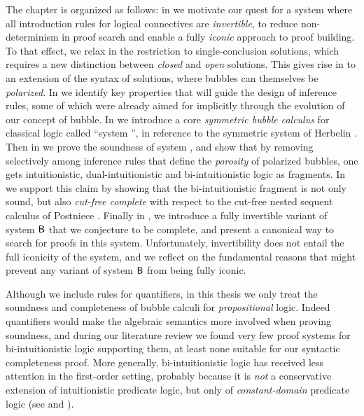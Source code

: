 The chapter is organized as follows: in  we motivate our
quest for a system where all introduction rules for logical connectives are
\emph{invertible}, to reduce non-determinism in proof search and enable a fully
\emph{iconic} approach to proof building. To that effect, we relax in
 the restriction to single-conclusion solutions, which
requires a new distinction between \emph{closed} and \emph{open} solutions. This
gives rise in  to an extension of the syntax of solutions, where
bubbles can themselves be \emph{polarized}. In  we identify
key properties that will guide the design of inference rules, some of which were
already aimed for implicitly through the evolution of our concept of bubble. In
 we introduce a core \emph{symmetric bubble calculus}
for classical logic called ``system '', in reference to the symmetric
system  of Herbelin . Then in
 we prove the soundness of system , and show
that by removing selectively among inference rules that define the
\emph{porosity} of polarized bubbles, one gets intuitionistic,
dual-intuitionistic and bi-intuitionistic logic as fragments. In
 we support this claim by showing that the
bi-intuitionistic fragment is not only sound, but also \emph{cut-free complete}
with respect to the cut-free nested sequent calculus  of Postniece
\cite{postniece_deep_2009}. Finally in , we
introduce a fully invertible variant of system $\sysB$ that we conjecture to be
complete, and present a canonical way to search for proofs in this system.
Unfortunately, invertibility does not entail the full iconicity of the system,
and we reflect on the fundamental reasons that might prevent any variant of
system $\sysB$ from being fully iconic.


\begin{remark}
  Although we include rules for quantifiers, in this thesis we only treat the
soundness and completeness of bubble calculi for \emph{propositional} logic.
Indeed quantifiers would make the algebraic semantics more involved when proving
soundness, and during our literature review we found very few proof systems for
bi-intuitionistic logic supporting them, at least none suitable for our
syntactic completeness proof. More generally, bi-intuitionistic logic has
received less attention in the first-order setting, probably because it is
\emph{not} a conservative extension of intuitionistic predicate logic, but only
of \emph{constant-domain} predicate logic (see \cite{crolard_subtractive_2001}
and \cite{aschieri_natural_2018}).
\end{remark}

